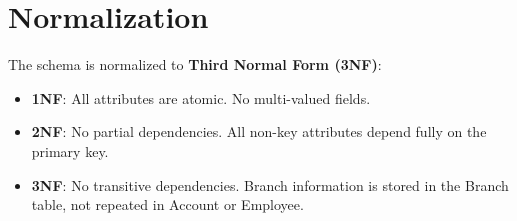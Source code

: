 \section{Normalization}

The schema is normalized to \textbf{Third Normal Form (3NF)}:

\begin{itemize}
  \item \textbf{1NF}: All attributes are atomic. No multi-valued fields.
  \item \textbf{2NF}: No partial dependencies. All non-key attributes depend
        fully on the primary key.
  \item \textbf{3NF}: No transitive dependencies. Branch information is stored
        in the Branch table, not repeated in Account or Employee.
\end{itemize}
